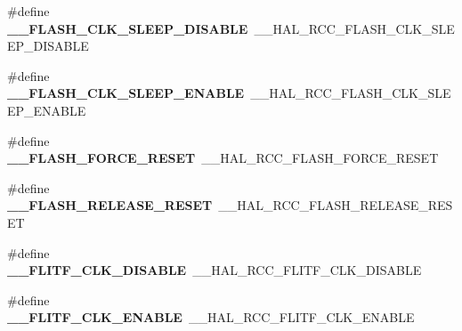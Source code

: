 \begin{DoxyCompactItemize}
\item 
\hypertarget{group___h_a_l___r_c_c___aliased_ga693fcefbe588aab88ed03b34cbd654a2}{\#define {\bfseries \-\_\-\-\_\-\-F\-L\-A\-S\-H\-\_\-\-C\-L\-K\-\_\-\-S\-L\-E\-E\-P\-\_\-\-D\-I\-S\-A\-B\-L\-E}~\-\_\-\-\_\-\-H\-A\-L\-\_\-\-R\-C\-C\-\_\-\-F\-L\-A\-S\-H\-\_\-\-C\-L\-K\-\_\-\-S\-L\-E\-E\-P\-\_\-\-D\-I\-S\-A\-B\-L\-E}\label{group___h_a_l___r_c_c___aliased_ga693fcefbe588aab88ed03b34cbd654a2}

\item 
\hypertarget{group___h_a_l___r_c_c___aliased_gaef4f7736b82351cdf009eb0a52443fc4}{\#define {\bfseries \-\_\-\-\_\-\-F\-L\-A\-S\-H\-\_\-\-C\-L\-K\-\_\-\-S\-L\-E\-E\-P\-\_\-\-E\-N\-A\-B\-L\-E}~\-\_\-\-\_\-\-H\-A\-L\-\_\-\-R\-C\-C\-\_\-\-F\-L\-A\-S\-H\-\_\-\-C\-L\-K\-\_\-\-S\-L\-E\-E\-P\-\_\-\-E\-N\-A\-B\-L\-E}\label{group___h_a_l___r_c_c___aliased_gaef4f7736b82351cdf009eb0a52443fc4}

\item 
\hypertarget{group___h_a_l___r_c_c___aliased_ga61f4844e1d6ead1201a1719955eaedac}{\#define {\bfseries \-\_\-\-\_\-\-F\-L\-A\-S\-H\-\_\-\-F\-O\-R\-C\-E\-\_\-\-R\-E\-S\-E\-T}~\-\_\-\-\_\-\-H\-A\-L\-\_\-\-R\-C\-C\-\_\-\-F\-L\-A\-S\-H\-\_\-\-F\-O\-R\-C\-E\-\_\-\-R\-E\-S\-E\-T}\label{group___h_a_l___r_c_c___aliased_ga61f4844e1d6ead1201a1719955eaedac}

\item 
\hypertarget{group___h_a_l___r_c_c___aliased_ga7911a352df6fda64eefb9078dd4689a5}{\#define {\bfseries \-\_\-\-\_\-\-F\-L\-A\-S\-H\-\_\-\-R\-E\-L\-E\-A\-S\-E\-\_\-\-R\-E\-S\-E\-T}~\-\_\-\-\_\-\-H\-A\-L\-\_\-\-R\-C\-C\-\_\-\-F\-L\-A\-S\-H\-\_\-\-R\-E\-L\-E\-A\-S\-E\-\_\-\-R\-E\-S\-E\-T}\label{group___h_a_l___r_c_c___aliased_ga7911a352df6fda64eefb9078dd4689a5}

\item 
\hypertarget{group___h_a_l___r_c_c___aliased_ga12f4502b35811f253e6a23d42a048b82}{\#define {\bfseries \-\_\-\-\_\-\-F\-L\-I\-T\-F\-\_\-\-C\-L\-K\-\_\-\-D\-I\-S\-A\-B\-L\-E}~\-\_\-\-\_\-\-H\-A\-L\-\_\-\-R\-C\-C\-\_\-\-F\-L\-I\-T\-F\-\_\-\-C\-L\-K\-\_\-\-D\-I\-S\-A\-B\-L\-E}\label{group___h_a_l___r_c_c___aliased_ga12f4502b35811f253e6a23d42a048b82}

\item 
\hypertarget{group___h_a_l___r_c_c___aliased_ga18ea2573c2441635fb10ae66bd5babf2}{\#define {\bfseries \-\_\-\-\_\-\-F\-L\-I\-T\-F\-\_\-\-C\-L\-K\-\_\-\-E\-N\-A\-B\-L\-E}~\-\_\-\-\_\-\-H\-A\-L\-\_\-\-R\-C\-C\-\_\-\-F\-L\-I\-T\-F\-\_\-\-C\-L\-K\-\_\-\-E\-N\-A\-B\-L\-E}\label{group___h_a_l___r_c_c___aliased_ga18ea2573c2441635fb10ae66bd5babf2}


\end{DoxyCompactItemize}
